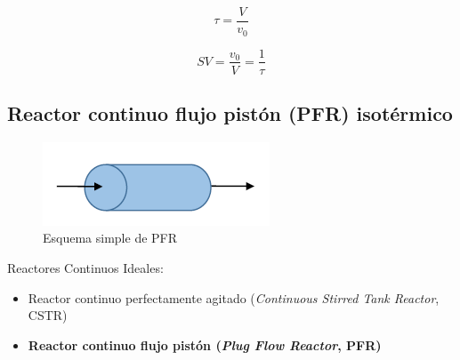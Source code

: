             \begin{quote}
                \textit{}
            \end{quote}
            
            \begin{equation}
            \label{eq:tiempo_residencia}
                \tau = \frac{V}{v_{0}}
            \end{equation}
            
            
            \begin{equation}
            \label{eq:velocidad_espacial}
                SV = \frac{v_{0}}{V} = \frac{1}{\tau}
            \end{equation}
        
    \subsection{Reactor continuo flujo pistón (PFR) isotérmico}
    
    \begin{minipage}{0.3\linewidth}
        \begin{figure}
            \centering
            \includegraphics[width=\textwidth]{img/diagramas/esquema_pfr.png}
            \caption{Esquema simple de PFR}
            \label{fig:esquema_PFR}
        \end{figure}
    \end{minipage}
    \begin{minipage}{0.6\linewidth}
        Reactores Continuos Ideales:
    
        \begin{itemize}
            \item Reactor continuo perfectamente agitado (\textit{Continuous Stirred Tank Reactor}, CSTR)
            \item \textbf{Reactor continuo flujo pistón (\textit{Plug Flow Reactor}, PFR)}
        \end{itemize}
    \end{minipage}
    \newline
    
